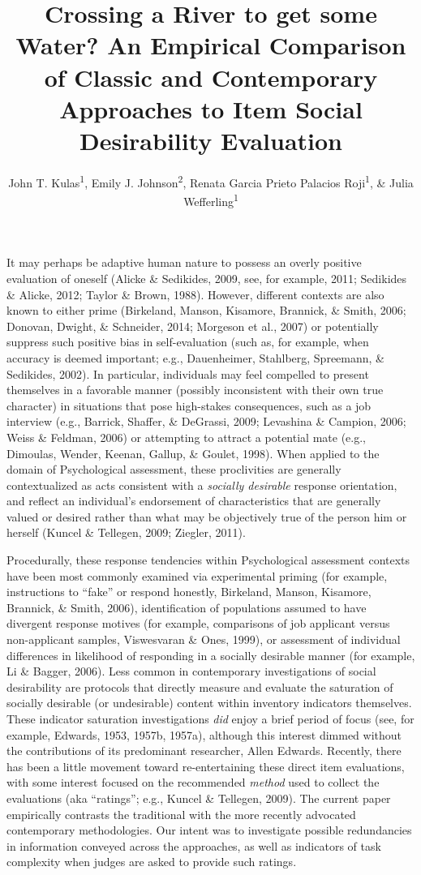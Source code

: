 \documentclass[
  english,
  ,jou]{apa6}
\title{Crossing a River to get some Water? An Empirical Comparison of Classic and Contemporary Approaches to Item Social Desirability Evaluation}
\author{John T. Kulas\textsuperscript{1}, Emily J. Johnson\textsuperscript{2}, Renata Garcia Prieto Palacios Roji\textsuperscript{1}, \& Julia Wefferling\textsuperscript{1}}
\date{}
\affiliation{\vspace{0.5cm}\textsuperscript{1} Montclair State University\\\textsuperscript{2} St.~Cloud State University}
\begin{document}
\maketitle

It may perhaps be adaptive human nature to possess an overly positive evaluation of oneself (Alicke \& Sedikides, 2009, see, for example, 2011; Sedikides \& Alicke, 2012; Taylor \& Brown, 1988). However, different contexts are also known to either prime (Birkeland, Manson, Kisamore, Brannick, \& Smith, 2006; Donovan, Dwight, \& Schneider, 2014; Morgeson et al., 2007) or potentially suppress such positive bias in self-evaluation (such as, for example, when accuracy is deemed important; e.g., Dauenheimer, Stahlberg, Spreemann, \& Sedikides, 2002). In particular, individuals may feel compelled to present themselves in a favorable manner (possibly inconsistent with their own true character) in situations that pose high-stakes consequences, such as a job interview (e.g., Barrick, Shaffer, \& DeGrassi, 2009; Levashina \& Campion, 2006; Weiss \& Feldman, 2006) or attempting to attract a potential mate (e.g., Dimoulas, Wender, Keenan, Gallup, \& Goulet, 1998). When applied to the domain of Psychological assessment, these proclivities are generally contextualized as acts consistent with a \emph{socially desirable} response orientation, and reflect an individual's endorsement of characteristics that are generally valued or desired rather than what may be objectively true of the person him or herself (Kuncel \& Tellegen, 2009; Ziegler, 2011).

Procedurally, these response tendencies within Psychological assessment contexts have been most commonly examined via experimental priming (for example, instructions to {``fake''} or respond honestly, Birkeland, Manson, Kisamore, Brannick, \& Smith, 2006), identification of populations assumed to have divergent response motives (for example, comparisons of job applicant versus non-applicant samples, Viswesvaran \& Ones, 1999), or assessment of individual differences in likelihood of responding in a socially desirable manner (for example, Li \& Bagger, 2006). Less common in contemporary investigations of social desirability are protocols that directly measure and evaluate the saturation of socially desirable (or undesirable) content within inventory indicators themselves. These indicator saturation investigations \emph{did} enjoy a brief period of focus (see, for example, Edwards, 1953, 1957b, 1957a), although this interest dimmed without the contributions of its predominant researcher, Allen Edwards. Recently, there has been a little movement toward re-entertaining these direct item evaluations, with some interest focused on the recommended \emph{method} used to collect the evaluations (aka {``ratings''}; e.g., Kuncel \& Tellegen, 2009). The current paper empirically contrasts the traditional with the more recently advocated contemporary methodologies. Our intent was to investigate possible redundancies in information conveyed across the approaches, as well as indicators of task complexity when judges are asked to provide such ratings.
\end{document}
